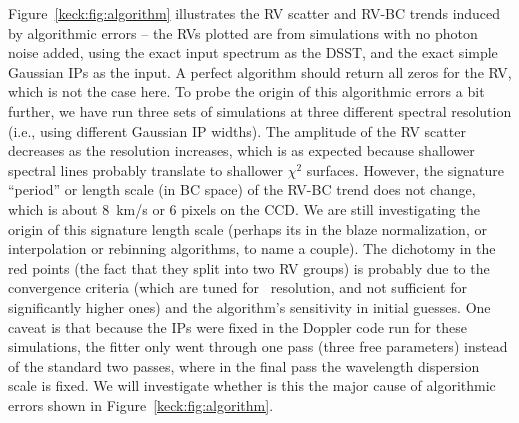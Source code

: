 Figure~\ref{keck:fig:algorithm} illustrates the RV scatter and RV-BC
trends induced by algorithmic errors -- the RVs plotted are from
simulations with no photon noise added, using the exact input spectrum
as the DSST, and the exact simple Gaussian IPs as the input. A perfect
algorithm should return all zeros for the RV, which is not the case
here. To probe the origin of this algorithmic errors a bit further, we
have run three sets of simulations at three different spectral
resolution (i.e., using different Gaussian IP widths). The amplitude
of the RV scatter decreases as the resolution increases, which is as
expected because shallower spectral lines probably translate to
shallower $\chi^2$ surfaces. However, the signature ``period'' or
length scale (in BC space) of the RV-BC trend does not change, which
is about 8~km/s or 6 pixels on the CCD. We are still investigating the
origin of this signature length scale (perhaps its in the blaze
normalization, or interpolation or rebinning algorithms, to name a
couple). The dichotomy in the red points (the fact that they split
into two RV groups) is probably due to the convergence criteria (which
are tuned for \keck\ resolution, and not sufficient for significantly
higher ones) and the algorithm's sensitivity in initial guesses. One
caveat is that because the IPs were fixed in the Doppler code run for
these simulations, the fitter only went through one pass (three free
parameters) instead of the standard two passes, where in the final
pass the wavelength dispersion scale is fixed. We will investigate
whether is this the major cause of algorithmic errors shown in
Figure~\ref{keck:fig:algorithm}. 


